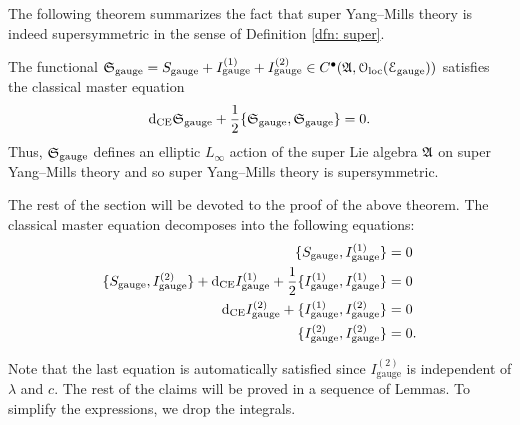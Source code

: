 \documentclass[10pt, oneside]{article}
\newcommand{\gauge}{\mathrm{gauge}}
\begin{document}
The following theorem summarizes the fact that super Yang--Mills theory is indeed supersymmetric in the sense of Definition \ref{dfn: super}. 

\begin{thm}\label{thm:gaugemultipletSUSY}
The functional $\fS_{\gauge} = S_{\gauge} + I_{\gauge}^{(1)} + I_{\gauge}^{(2)} \in C^\bu(\mf{A}, \oloc(\cE_{\gauge}))$ satisfies the classical master equation
\[\d_{\mr{CE}} \fS_{\gauge} + \frac{1}{2}\{\fS_{\gauge}, \fS_{\gauge}\} = 0.\]
Thus, $\fS_{\gauge}$ defines an elliptic $L_\infty$ action of the super Lie algebra $\mathfrak A$ on super Yang--Mills theory and so super Yang--Mills theory is supersymmetric.  
\end{thm}

The rest of the section will be devoted to the proof of the above theorem. The classical master equation decomposes into the following equations:
\begin{align*}
\{S_{\gauge}, I_{\gauge}^{(1)}\} &= 0 \\
\{S_{\gauge}, I_{\gauge}^{(2)}\} + \d_{\mr{CE}} I_{\gauge}^{(1)} + \frac{1}{2}\{I_{\gauge}^{(1)}, I_{\gauge}^{(1)}\} &= 0 \\
\d_{\mr{CE}} I_{\gauge}^{(2)} + \{I_{\gauge}^{(1)}, I_{\gauge}^{(2)}\} &= 0 \\
\{I_{\gauge}^{(2)}, I_{\gauge}^{(2)}\} &= 0.
\end{align*}

Note that the last equation is automatically satisfied since $I_{\gauge}^{(2)}$ is independent of $\lambda$ and $c$. The rest of the claims will be proved in a sequence of Lemmas. To simplify the expressions, we drop the integrals.
\end{document}

